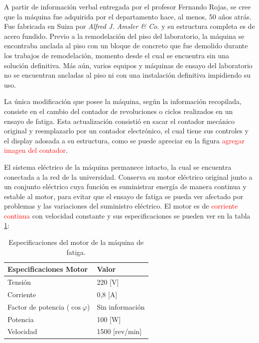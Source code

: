 A partir de información verbal entregada por el profesor Fernando Rojas, se cree que la máquina fue adquirida por el departamento hace, al menos, 50 años atrás. Fue fabricada en Suiza por \textit{Alfred J. Amsler \& Co.} y su estructura completa es de acero fundido. Previo a la remodelación del piso del laboratorio, la máquina se encontraba anclada al piso con un bloque de concreto que fue demolido durante los trabajos de remodelación, momento desde el cual se encuentra sin una solución definitiva. Más aún, varios equipos y máquinas de ensayo del laboratorio no se encuentran ancladas al piso ni con una instalación definitiva impidiendo su uso.

La única modificación que posee la máquina, según la información recopilada, consiste en el cambio del contador de revoluciones o ciclos realizados en un ensayo de fatiga. Esta actualización consistió en sacar el contador mecánico original y reemplazarlo por un contador electrónico, el cual tiene sus controles y el display adosada a su estructura, como se puede apreciar en la figura \textcolor{red}{agregar imagen del contador}. 

El sistema eléctrico de la máquina permanece intacto, la cual se encuentra conectada a la red de la universidad. Conserva su motor eléctrico original junto a un conjunto eléctrico cuya función es suministrar energía de manera continua y estable al motor, para evitar que el ensayo de fatiga se pueda ver afectado por problemas y las variaciones del suministro eléctrico. El motor es de \textcolor{red}{corriente continua} con velocidad constante y sus especificaciones se pueden ver en la tabla \ref{tab:motor_maq}:

\begin{table}[h]
\centering
\begin{tabular}{ll}
\hline
Especificaciones Motor                            & Valor   				\\ \hline
Tensión                                           & 220 {[}V{]}        		\\
Corriente                                         & 0,8 {[}A{]}        		\\
Factor de potencia ($\cos \varphi$)				  & Sin información    		\\
Potencia                                          & 100 {[}W{]}        		\\
Velocidad                                         & 1500 {[}rev/min{]} 		\\ \hline
\end{tabular}
\caption{Especificaciones del motor de la máquina de fatiga.}
\label{tab:motor_maq}
\end{table}

